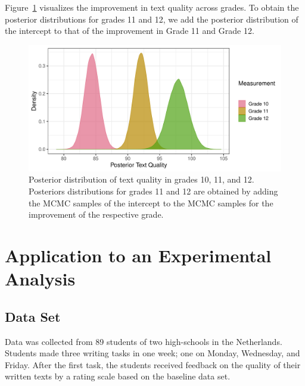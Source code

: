\documentclass[a4paper]{article}
\newcommand{\DON}	[1] 	{\todo[linecolor=gray, backgroundcolor=white]	{Don: 	{#1}}}
\begin{document}
Figure~\ref{fig:baselinePosteriorTextQuality} visualizes the improvement in text quality across grades. To obtain the posterior distributions for grades 11 and 12, we add the posterior distribution of the intercept to that of the improvement in Grade 11 and Grade 12.
\begin{figure}[!ht]
	\includegraphics[width=\textwidth]{baselinePosteriorTextQualityOverGrades.pdf}
	\caption{Posterior distribution of text quality in grades 10, 11, and 12. Posteriors distributions for grades 11 and 12 are obtained by adding the MCMC samples of the intercept to the MCMC samples for the improvement of the respective grade.}
	\label{fig:baselinePosteriorTextQuality}
\end{figure}

\section*{Application to an Experimental Analysis}

\subsection*{Data Set}
Data was collected from 89 students of two high-schools in the Netherlands. Students made three writing tasks in one week; one on Monday, Wednesday, and Friday. After the first task, the students received feedback on the quality of their written texts by a rating scale based on the baseline data set.
\DON{Aanvullen aub!}
\end{document}
